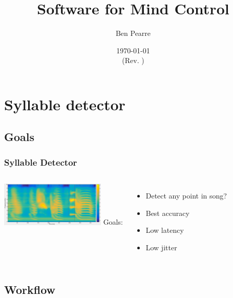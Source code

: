 \documentclass{beamer}
\title{Software for Mind Control}
\author{Ben Pearre}
\date{\today\\{\small (Rev. \svnrev)}}
\begin{document}
\begin{frame}
  \titlepage
\end{frame}





\section{Syllable detector}
\subsection{Goals}

\begin{frame}
  \frametitle{Syllable Detector}
  \begin{columns}
    \column{5cm}
    \includegraphics[width=5cm]{song-spectrogram-with-alignment-1}
    \column{50mm}
    Goals:
    \begin{itemize}
    \item Detect any point in song?
    \item Best accuracy
    \item Low latency
    \item Low jitter
    \end{itemize}
  \end{columns}
\end{frame}

\subsection{Workflow}
\end{document}

